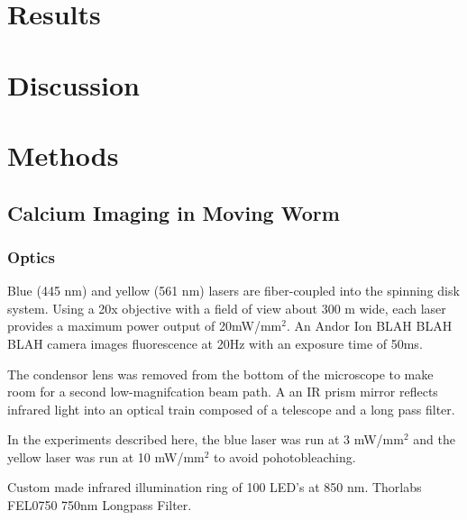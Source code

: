 \section{Results}

\section{Discussion}

\section{Methods}


\subsection{Calcium Imaging in Moving Worm}
\subsubsection{Optics}\label{sec:omegaOptics}

Blue (445 nm) and yellow (561 nm) lasers are fiber-coupled into the spinning disk system. Using a 20x objective with a field of view  about 300 \textmu m wide, each laser  provides a maximum power output of 20mW/mm$^2$. An Andor Ion BLAH BLAH BLAH camera images fluorescence at 20Hz with an exposure time of 50ms. 

The condensor lens was removed from the bottom of the microscope to make room for a second low-magnifcation beam path. A an IR prism mirror reflects infrared light into an optical train composed of a telescope and a long pass filter.  

In the experiments described here, the blue laser was run at 3 mW/mm$^2$ and the yellow laser was run at 10 mW/mm$^2$ to avoid pohotobleaching. 

Custom made infrared illumination ring of 100 LED's at 850 nm. 
Thorlabs FEL0750  750nm Longpass Filter.





